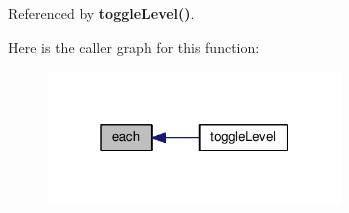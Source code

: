Referenced by {\bf toggle\+Level()}.



Here is the caller graph for this function\+:
\nopagebreak
\begin{figure}[H]
\begin{center}
\leavevmode
\includegraphics[width=220pt]{da/d66/soapysdr_2build_2docs_2html_2jquery_8js_a871ff39db627c54c710a3e9909b8234c_icgraph}
\end{center}
\end{figure}


